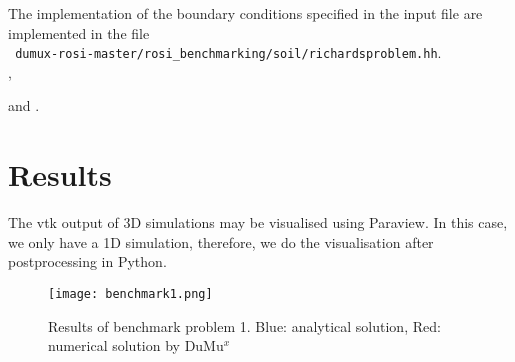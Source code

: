 %	

%	

The implementation of the boundary conditions specified in the input file are implemented in the file\\ 
\verb+ dumux-rosi-master/rosi_benchmarking/soil/richardsproblem.hh+.\\
,
%
	
and
.		
											

\section*{Results}
The vtk output of 3D simulations may be visualised using Paraview. In this case, we only have a 1D simulation, therefore, we do the visualisation after postprocessing in Python. 

\begin{figure}[ht]
	\centering
  \texttt{[image: benchmark1.png]}
	\captionsetup{labelformat=empty}
	\caption{Results of benchmark problem 1. Blue: analytical solution, Red: numerical solution by DuMu$^x$}
\end{figure}

